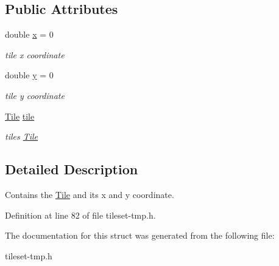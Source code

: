 \subsection*{Public Attributes}
\begin{DoxyCompactItemize}
\item 
double \hyperlink{structTilesettmp_1_1tile_aac4330dd1d3666f282ac3c44a34188fd}{x} = 0\hypertarget{structTilesettmp_1_1tile_aac4330dd1d3666f282ac3c44a34188fd}{}\label{structTilesettmp_1_1tile_aac4330dd1d3666f282ac3c44a34188fd}

\begin{DoxyCompactList}\small\item\em tile x coordinate \end{DoxyCompactList}\item 
double \hyperlink{structTilesettmp_1_1tile_a0bffb2db37910dd1fcac0560c44453ca}{y} = 0\hypertarget{structTilesettmp_1_1tile_a0bffb2db37910dd1fcac0560c44453ca}{}\label{structTilesettmp_1_1tile_a0bffb2db37910dd1fcac0560c44453ca}

\begin{DoxyCompactList}\small\item\em tile y coordinate \end{DoxyCompactList}\item 
\hyperlink{classTile}{Tile} \hyperlink{structTilesettmp_1_1tile_a96e22db21336d5d4a86fa1b69bf877ec}{tile}\hypertarget{structTilesettmp_1_1tile_a96e22db21336d5d4a86fa1b69bf877ec}{}\label{structTilesettmp_1_1tile_a96e22db21336d5d4a86fa1b69bf877ec}

\begin{DoxyCompactList}\small\item\em tile\textquotesingle{}s \hyperlink{classTile}{Tile} \end{DoxyCompactList}\end{DoxyCompactItemize}


\subsection{Detailed Description}
Contains the \hyperlink{classTile}{Tile} and its x and y coordinate. 

Definition at line 82 of file tileset-\/tmp.\+h.



The documentation for this struct was generated from the following file\+:\begin{DoxyCompactItemize}
\item 
tileset-\/tmp.\+h\end{DoxyCompactItemize}
